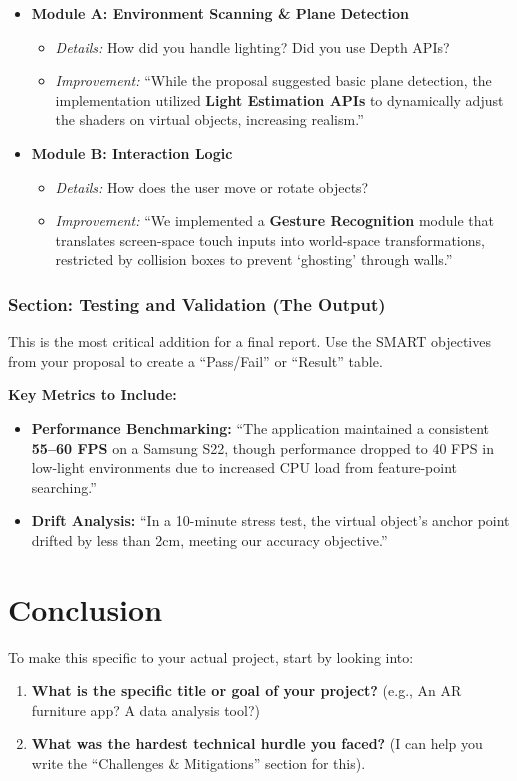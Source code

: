 \documentclass[twoside,12pt,openright]{report}
\begin{document}
\begin{itemize}
  \item \textbf{Module A: Environment Scanning \& Plane Detection}
    \begin{itemize}
      \item \textit{Details:} How did you handle lighting? Did you use Depth
        APIs?
      \item \textit{Improvement:} ``While the proposal suggested basic plane
        detection, the implementation utilized \textbf{Light Estimation APIs}
        to dynamically adjust the shaders on virtual objects, increasing
        realism.''
    \end{itemize}
  \item \textbf{Module B: Interaction Logic}
    \begin{itemize}
      \item \textit{Details:} How does the user move or rotate objects?
      \item \textit{Improvement:} ``We implemented a \textbf{Gesture
        Recognition} module that translates screen-space touch inputs into
        world-space transformations, restricted by collision boxes to prevent
        `ghosting' through walls.''
    \end{itemize}
\end{itemize}

\subsection{Section: Testing and Validation (The Output)}

This is the most critical addition for a final report. Use the SMART objectives
from your proposal to create a ``Pass/Fail'' or ``Result'' table.

\textbf{Key Metrics to Include:}

\begin{itemize}
  \item \textbf{Performance Benchmarking:} ``The application maintained a
    consistent \textbf{55--60 FPS} on a Samsung S22, though performance dropped
    to 40 FPS in low-light environments due to increased CPU load from
    feature-point searching.''
  \item \textbf{Drift Analysis:} ``In a 10-minute stress test, the virtual
    object's anchor point drifted by less than 2cm, meeting our accuracy
    objective.''
\end{itemize}

\chapter{Conclusion}

To make this specific to your actual project, start by looking into:

\begin{enumerate}
  \item \textbf{What is the specific title or goal of your project?}
    (e.g., An AR furniture app? A data analysis tool?)
  \item \textbf{What was the hardest technical hurdle you faced?}
    (I can help you write the ``Challenges \& Mitigations'' section for this).
\end{enumerate}
\end{document}
